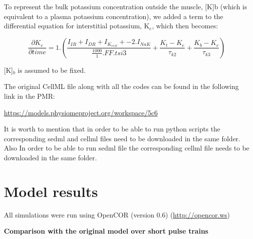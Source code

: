 \documentclass[fleqn,10pt]{physiome}
\begin{document}
To represent the bulk potassium concentration outside the muscle, [K]b (which is equivalent to a plasma potassium concentration), we added a term to the differential equation for interstitial potassium, K$_e$, which then becomes:

\begin{equation}
    \frac{\partial K_e}{\partial time} = 1. (\frac{I_{IR}+I_{DR}+I_{{K}_{rest}}+ - 2.I_{NaK}}{\frac{1000}{1}.FF.tsi3}+\frac{K_t-K_e}{\tau_{k2}}+\frac{K_b-K_e}{\tau_{k3}})
\end{equation}

[K]$_b$ is assumed to be fixed.\newline

The original CellML file along with all the codes can be found in the following link in the PMR:\newline

\url{https://models.physiomeproject.org/workspace/5c6}

It is worth to mention that in order to be able to run python scripts the corresponding sedml and cellml files need to be downloaded in the same folder. Also In order to be able to run sedml file the corresponding cellml file needs to be downloaded in the same folder.


\section{Model results}

All simulations were run using OpenCOR (version 0.6) \citep{garny2015opencor}\newline(\url{http://opencor.ws})\newline

\textbf{Comparison with the original model over short pulse trains}\newline
\end{document}
